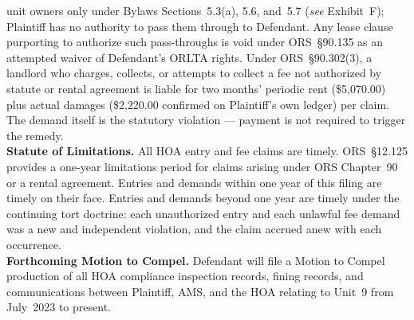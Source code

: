 \documentclass[10pt,letterpaper,oneside]{extarticle}
\begin{document}
unit owners only under Bylaws Sections~5.3(a), 5.6, and~5.7
(\textit{see} Exhibit~F); Plaintiff has no authority to
pass them through to Defendant. Any lease clause purporting
to authorize such pass-throughs is void under ORS~\S90.135
as an attempted waiver of Defendant's ORLTA rights. Under
ORS~\S90.302(3), a landlord who charges, collects, or
attempts to collect a fee not authorized by statute or
rental agreement is liable for two months' periodic rent
(\$5,070.00) plus actual damages (\$2,220.00 confirmed on
Plaintiff's own ledger) per claim. The demand itself is the
statutory violation --- payment is not required to trigger
the remedy.\\
\indent \textbf{Statute of Limitations.} All HOA entry and
fee claims are timely. ORS~\S12.125 provides a one-year
limitations period for claims arising under ORS Chapter~90
or a rental agreement. Entries and demands within one year
of this filing are timely on their face. Entries and demands
beyond one year are timely under the continuing tort
doctrine: each unauthorized entry and each unlawful fee
demand was a new and independent violation, and the claim
accrued anew with each occurrence.\\
\indent \textbf{Forthcoming Motion to Compel.} Defendant
will file a Motion to Compel production of all HOA
compliance inspection records, fining records, and
communications between Plaintiff, AMS, and the HOA relating
to Unit~9 from July~2023 to present.
\end{document}
